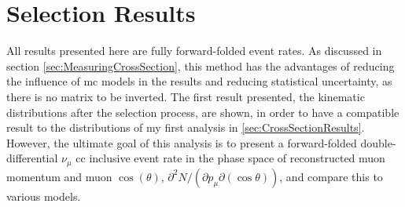 
\section{Selection Results}
All results presented here are fully forward-folded event rates. As discussed in section \ref{sec:MeasuringCrossSection}, this method has the advantages of reducing the influence of \gls{mc} models in the results and reducing statistical uncertainty, as there is no matrix to be inverted. The first result presented, the kinematic distributions after the selection process, are shown, in order to have a compatible result to the distributions of my first analysis in \ref{sec:CrossSectionResults}. However, the ultimate goal of this analysis is to present a forward-folded double-differential $\nu_\mu$ \gls{cc} inclusive event rate in the phase space of reconstructed muon momentum and muon $\cos{(\theta)}$, \ie $\partial^2N/(\partial p_\mu \partial(\cos\theta))$, and compare this to various models.

